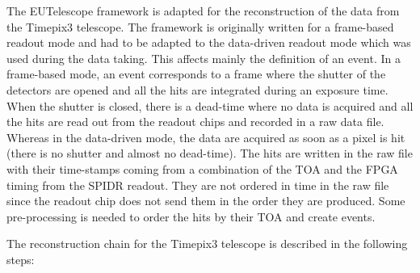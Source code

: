 The EUTelescope framework is adapted for the reconstruction of the
data from the Timepix3 telescope. The framework is originally written
for a frame-based readout mode and had to be adapted to the
data-driven readout mode which was used during the data taking. This
affects mainly the definition of an event. In a frame-based mode, an
event corresponds to a frame where the shutter of the detectors are
opened and all the hits are integrated during an exposure time. When
the shutter is closed, there is a dead-time where no data is acquired
and all the hits are read out from the readout chips and recorded in a
raw data file. Whereas in the data-driven mode, the data are acquired
as soon as a pixel is hit (there is no shutter and almost no
dead-time). The hits are written in the raw file with their
time-stamps coming from a combination of the TOA and the FPGA timing
from the SPIDR readout. They are not ordered in time in the raw file
since the readout chip does not send them in the order they are
produced. Some pre-processing is needed to order the hits by their TOA
and create events.

The reconstruction chain for the Timepix3 telescope is described in
the following steps:


